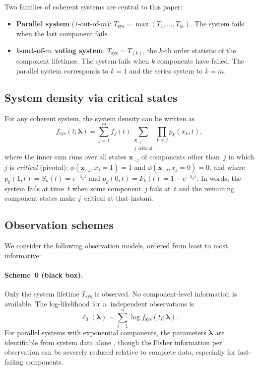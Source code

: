 \documentclass[12pt]{article}
\theoremstyle{definition}
\theoremstyle{remark}
\newcommand{\blam}{\boldsymbol{\lambda}}
\begin{document}
Two families of coherent systems are central to this paper:
\begin{itemize}
  \item \textbf{Parallel system} ($1$-out-of-$m$):
    $T_{\mathrm{sys}} = \max(T_1, \ldots, T_m)$.  The system fails
    when the last component fails.
  \item \textbf{$k$-out-of-$m$ voting system}:
    $T_{\mathrm{sys}} = T_{(k)}$, the $k$-th order statistic of the
    component lifetimes.  The system fails when $k$ components have
    failed.  The parallel system corresponds to $k = 1$ and the series
    system to $k = m$.
\end{itemize}

\subsection{System density via critical states}
\label{sec:sys-density}

For any coherent system, the system density can be written as
\begin{equation}\label{eq:sys-density}
  f_{\mathrm{sys}}(t; \blam) = \sum_{j=1}^{m} f_j(t)
    \sum_{\substack{\mathbf{x}_{-j}:\\ j \text{ critical}}}
    \prod_{k \neq j} p_k(x_k, t),
\end{equation}
where the inner sum runs over all states $\mathbf{x}_{-j}$ of
components other than~$j$ in which $j$ is \emph{critical} (pivotal):
$\phi(\mathbf{x}_{-j}, x_j = 1) = 1$ and
$\phi(\mathbf{x}_{-j}, x_j = 0) = 0$, and where
$p_k(1, t) = S_k(t) = e^{-\lambda_k t}$ and
$p_k(0, t) = F_k(t) = 1 - e^{-\lambda_k t}$.
In words, the system fails at time~$t$ when some component~$j$ fails
at~$t$ and the remaining component states make $j$~critical at that
instant.

\subsection{Observation schemes}
\label{sec:schemes}

We consider the following observation models, ordered from least to
most informative:

\paragraph{Scheme~0 (black box).}
Only the system lifetime $T_{\mathrm{sys}}$ is observed.  No
component-level information is available.  The log-likelihood for
$n$~independent observations is
\begin{equation}\label{eq:loglik-scheme0}
  \ell_0(\blam) = \sum_{i=1}^{n} \log f_{\mathrm{sys}}(t_i; \blam).
\end{equation}
For parallel systems with exponential components, the parameters
$\blam$ are identifiable from system data alone
\citep{BasuGhosh1980, Towell2026}, though the Fisher information per
observation can be severely reduced relative to complete data,
especially for fast-failing components.
\end{document}
